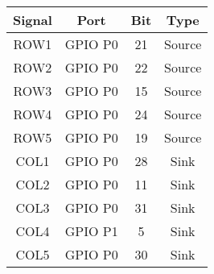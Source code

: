 \begin{tabular}{|c|c|c|c|}
    \hline
    \textbf{Signal} & \textbf{Port} & \textbf{Bit} & \textbf{Type} \\ \hline
    ROW1            & GPIO P0       & 21           & Source        \\ \hline
    ROW2            & GPIO P0       & 22           & Source        \\ \hline
    ROW3            & GPIO P0       & 15           & Source        \\ \hline
    ROW4            & GPIO P0       & 24           & Source        \\ \hline
    ROW5            & GPIO P0       & 19           & Source        \\ \hline
    COL1            & GPIO P0       & 28           & Sink          \\ \hline
    COL2            & GPIO P0       & 11           & Sink          \\ \hline
    COL3            & GPIO P0       & 31           & Sink          \\ \hline
    COL4            & GPIO P1       & 5            & Sink          \\ \hline
    COL5            & GPIO P0       & 30           & Sink          \\ \hline
\end{tabular}
